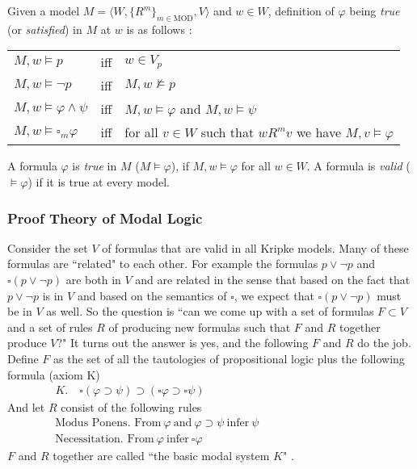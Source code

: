 \documentclass{article}
\begin{document}
Given a model $M = \langle W, \{R^m\}_{m\in \text{MOD}}, V\rangle$ and $w\in W$, definition of $\varphi$ being \emph{true} (or \emph{satisfied}) in $M$ at $w$ is as follows \cite{BlackburnEtAl07}:
\begin{center}
	\begin{tabular}{l l l}
		$M,w \vDash p$ &iff&   $w\in V_p$\\
		$M,w \vDash \neg p$ &iff&  $M,w \nvDash p$\\
		$M,w \vDash \varphi\land \psi$ &iff&   $M,w \vDash \varphi$ and $M,w \vDash \psi$\\
		$M,w \vDash \square_m\varphi$ &iff&   for all $v\in W$ such that $wR^mv$ we have  $M,v\vDash \varphi$\\
	\end{tabular}
\end{center}
A formula $\varphi$ is \emph{true} in $M$ ($M\vDash \varphi$), if $M,w \vDash \varphi$ for all $w\in W$. A formula is \emph{valid} ($\vDash \varphi$) if it is true at every model. \cite{Chellas80}\\

\subsubsection{Proof Theory of Modal Logic}\label{prooftheory}
Consider the set $V$ of formulas that are valid in all Kripke models. Many of these formulas are ``related" to each other. For example the formulas $p\lor\neg p$ and $\square(p\lor \neg p)$ are both in $V$ and are related in the sense that based on the fact that $p\lor \neg p$ is in $V$ and based on the semantics of $\square$, we expect that $\square(p\lor \neg p)$ must be in $V$ as well. So the question is ``can we come up with a set of formulas $F\subset V$ and a set of rules $R$ of producing new formulas such that $F$ and $R$ together produce $V$?" It turns out the answer is yes, and the following $F$ and $R$ do the job. Define $F$ as the set of all the tautologies of propositional logic plus the following formula (axiom K)
\begin{align*}
&K. \quad \square (\varphi \supset \psi)\supset (\square \varphi \supset \square \psi)&\hspace{6cm}
\end{align*}
And let $R$ consist of the following rules
\begin{align*}
&\text{Modus Ponens. From} \ \varphi \ \text{and} \ \varphi\supset \psi \ \text{infer}\  \psi&\hspace{4cm}\\
&\text{Necessitation. From} \ \varphi \ \text{infer}\  \square \varphi&
\end{align*}
$F$ and $R$ together are called ``the basic modal system $K$" \cite{vanDitmarschEtAl07}.\\
\end{document}
